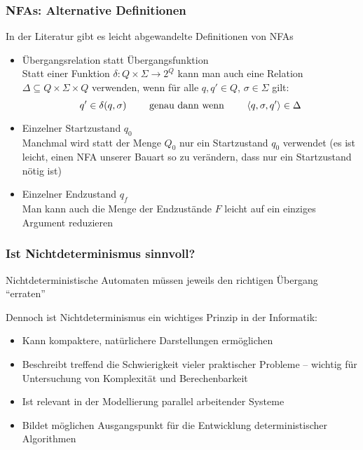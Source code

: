 \documentclass[aspectratio=1610,onlymath]{beamer}
\begin{document}
\begin{frame}\frametitle{NFAs: Alternative Definitionen}

In der Literatur gibt es leicht abgewandelte Definitionen von NFAs\pause

\begin{itemize}
\item \alert{Übergangsrelation statt Übergangsfunktion}\\
	Statt einer Funktion $\delta: Q\times\Sigma \to 2^Q$ kann man auch eine Relation $\Delta\subseteq Q\times\Sigma\times Q$ verwenden, wenn für alle $q,q'\in Q$, $\sigma\in\Sigma$ gilt:
	\[ q'\in\delta(q,\sigma) \qquad\text{ genau dann wenn }\qquad \langle{q,\sigma,q'}\rangle\in\Delta\]\pause
\item \alert{Einzelner Startzustand $q_0$}\\
	Manchmal wird statt der Menge $Q_0$ nur ein Startzustand $q_0$ verwendet (es ist leicht, einen NFA unserer Bauart so zu verändern, dass nur ein Startzustand nötig ist)\pause
\item \alert{Einzelner Endzustand $q_f$}\\
	Man kann auch die Menge der Endzustände $F$ leicht auf ein einziges Argument reduzieren
\end{itemize}

\end{frame}

\begin{frame}\frametitle{Ist Nichtdeterminismus sinnvoll?}

Nichtdeterministische Automaten müssen jeweils den richtigen Übergang "`erraten"'\\
\pause
\bigskip

Dennoch ist Nichtdeterminismus ein wichtiges Prinzip in der Informatik:
\begin{itemize}
\item Kann \alert{kompaktere, natürlichere Darstellungen} ermöglichen
\item Beschreibt treffend die Schwierigkeit vieler praktischer Probleme -- wichtig für
\alert{Untersuchung von Komplexität und Berechenbarkeit}
\item Ist relevant in der \alert{Modellierung parallel arbeitender Systeme}
\item Bildet möglichen Ausgangspunkt für die \alert{Entwicklung deterministischer Algorithmen}
\end{itemize}

\end{frame}
\end{document}
